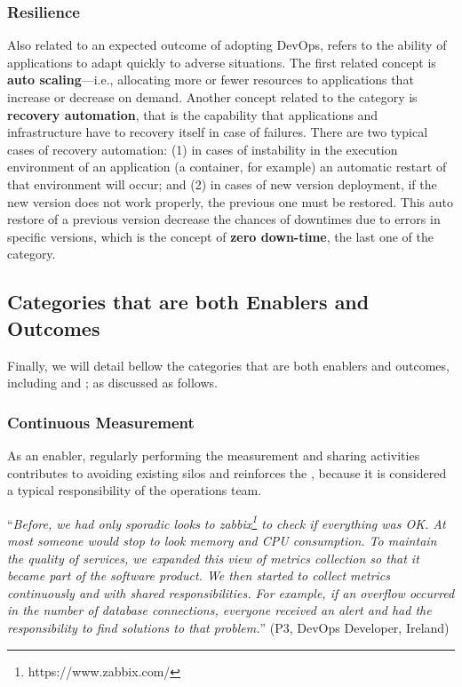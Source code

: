 \subsubsection{Resilience}

Also related to an expected outcome of adopting DevOps,  refers
to the ability of applications to adapt quickly to adverse situations.
The first related concept is \textbf{auto scaling}---i.e.,
allocating more or fewer resources to applications that increase or
decrease on demand. Another concept related to
the  category is \textbf{recovery automation}, that is
the capability that applications and infrastructure have to recovery itself in case of
failures. There are two typical cases of recovery automation: (1) in cases
of instability in the execution environment of an application (a
container, for example) an automatic restart of that environment will occur; and (2) in
cases of new version deployment, if the new version does not work properly, the
previous one must be restored. This auto restore of a previous version
decrease the chances of downtimes due to errors in specific versions, which
is the concept of \textbf{zero down-time}, the last one of the  category.

\subsection{Categories that are both Enablers and Outcomes}

Finally, we will detail bellow the categories that are both enablers
and outcomes, including 
and ; as discussed as follows.

\subsubsection{Continuous Measurement}

As an enabler, regularly performing the measurement and sharing activities
contributes to avoiding existing silos and reinforces the \cc, because it is
considered a typical responsibility of the operations team.

\begin{mq}
``\emph{Before, we had only sporadic looks to
zabbix\footnote{https://www.zabbix.com/} to check if everything was OK.
At most someone would stop to look memory and CPU consumption. To maintain
the quality of services, we expanded this view of metrics collection so that it
became part of the software product. We then started to collect metrics continuously
and with shared responsibilities. For example, if an overflow occurred in the
number of database connections, everyone received an alert and had
the responsibility to find solutions to that problem.}'' (P3, DevOps Developer, Ireland)
\end{mq}

